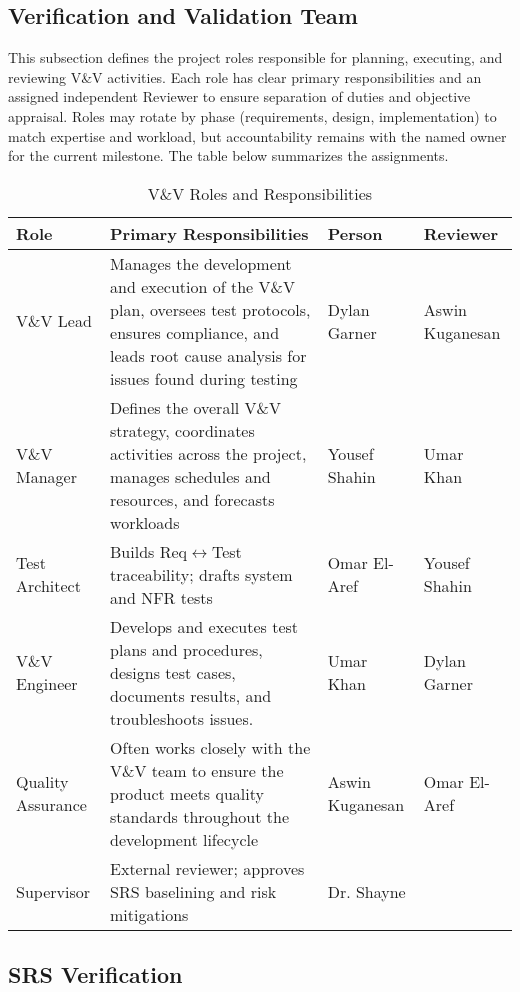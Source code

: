\documentclass[12pt, titlepage]{article}
\begin{document}
\subsection{Verification and Validation Team}

This subsection defines the project roles responsible for planning, executing, and reviewing V\&V activities. Each role has clear
primary responsibilities and an assigned independent Reviewer to ensure separation of duties and objective appraisal.
Roles may rotate by phase (requirements, design, implementation) to match expertise and workload, but accountability remains
with the named owner for the current milestone. The table below summarizes the assignments.

\begin{table}[h]
\centering
\caption{V\&V Roles and Responsibilities}
\begin{adjustbox}{max width=\textwidth,center}
\begin{tabular}{p{3.2cm} p{7.2cm} p{3cm} p{2cm}}
\toprule
\textbf{Role} & \textbf{Primary Responsibilities} & \textbf{Person} & \textbf{Reviewer}\\
\midrule
V\&V Lead & Manages the development and execution of the V\&V plan, oversees test protocols, ensures compliance, and leads root cause analysis for issues found during testing  & Dylan Garner & Aswin Kuganesan\\
V\&V Manager & Defines the overall V\&V strategy, coordinates activities across the project, manages schedules and resources, and forecasts workloads & Yousef Shahin & Umar Khan \\
Test Architect & Builds Req$\leftrightarrow$Test traceability; drafts system and NFR tests & Omar El-Aref & Yousef Shahin \\
V\&V Engineer &  Develops and executes test plans and procedures, designs test cases, documents results, and troubleshoots issues.  & Umar Khan & Dylan Garner \\
Quality Assurance & Often works closely with the V\&V team to ensure the product meets quality standards throughout the development lifecycle & Aswin Kuganesan & Omar El-Aref\\
Supervisor &  External reviewer; approves SRS baselining and risk mitigations & Dr. Shayne &  \\
\bottomrule
\end{tabular}
\end{adjustbox}
\end{table}

\subsection{SRS Verification}
\end{document}
